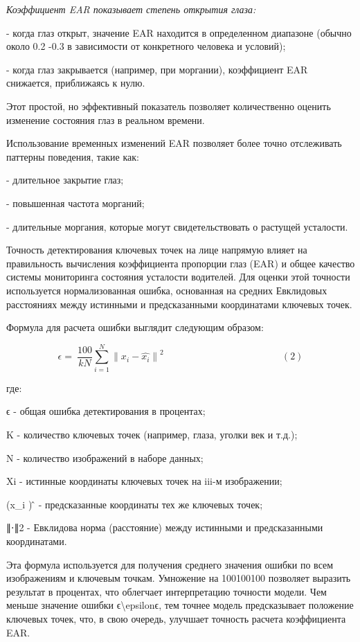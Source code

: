 \emph{Коэффициент EAR показывает степень открытия глаза:}

- когда глаз открыт, значение EAR находится в определенном диапазоне
(обычно около 0.2 -0.3 в зависимости от конкретного человека и условий);

- когда глаз закрывается (например, при моргании), коэффициент EAR
снижается, приближаясь к нулю.

Этот простой, но эффективный показатель позволяет количественно оценить
изменение состояния глаз в реальном времени.

Использование временных изменений EAR позволяет более точно отслеживать
паттерны поведения, такие как:

- длительное закрытие глаз;

- повышенная частота морганий;

- длительные моргания, которые могут свидетельствовать о растущей
усталости.

Точность детектирования ключевых точек на лице напрямую влияет на
правильность вычисления коэффициента пропорции глаз (EAR) и общее
качество системы мониторинга состояния усталости водителей. Для оценки
этой точности используется нормализованная ошибка, основанная на средних
Евклидовых расстояниях между истинными и предсказанными координатами
ключевых точек.

Формула для расчета ошибки выглядит следующим образом:

\[\epsilon = \ \frac{100}{kN}\sum_{i = 1}^{N}{\parallel x_{i} - \widehat{x_{i}} \parallel}^{2}\ \ \ \ \ \ \ \ \ \ \ \ \ \ \ \ \ \ \ \ \ \ \ \ \ \ \ \ \ \ \ \ \ \ \ \ \ \ \ \ \ \ \ \ \ \ \ \ \ \ \ \ \ \ \ (2)\]

где:

ϵ - общая ошибка детектирования в процентах;

Κ - количество ключевых точек (например, глаза, уголки век и т.д.);

N - количество изображений в наборе данных;

Xi - истинные координаты ключевых точек на iii-м изображении;

(x\_i ) ̂ - предсказанные координаты тех же ключевых точек;

∥⋅∥2 - Евклидова норма (расстояние) между истинными и предсказанными
координатами.

Эта формула используется для получения среднего значения ошибки по всем
изображениям и ключевым точкам. Умножение на 100100100 позволяет
выразить результат в процентах, что облегчает интерпретацию точности
модели. Чем меньше значение ошибки ϵ\textbackslash epsilonϵ, тем точнее
модель предсказывает положение ключевых точек, что, в свою очередь,
улучшает точность расчета коэффициента EAR.

